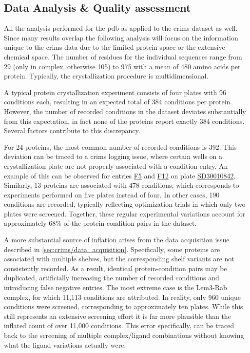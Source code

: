 \subsection{Data Analysis \& Quality assessment}

All the analysis performed for the \gls{pdb} as applied to the \gls{crims} dataset as well. Since many results overlap the following analysis will focus on the information unique to the \gls{crims} data due to the limited protein space or the extensive chemical space. 
The number of residues for the individual sequences range from 29 (only in complex, otherwise 105) to 975 with a mean of 480 amino acids per protein. Typically, the crystallization procedure is multidimensional. 

A typical protein crystallization experiment consists of four plates with 96 conditions each, resulting in an expected total of 384 conditions per protein. However, the number of recorded conditions in the dataset deviates substantially from this expectation, in fact none of the proteins report exactly 384 conditions. Several factors contribute to this discrepancy.

For 24 proteins, the most common number of recorded conditions is 392. This deviation can be traced to a \gls{crims} logging issue, where certain wells on a crystallization plate are not properly associated with a condition entry. An example of this can be observed for entries \href{https://htx-hh.embl.org/#/bridge/plates/SD30010842/inspections/5#F5-1}{F5} and \href{https://htx-hh.embl.org/#/bridge/plates/SD30010842/inspections/5#F12-1}{F12} on plate \href{https://htx-hh.embl.org/#/bridge/plates/SD30010842/inspections/5}{SD30010842}. Similarly, 13 proteins are associated with 478 conditions, which corresponds to experiments performed on five plates instead of four. In other cases, 190 conditions are recorded, typically reflecting optimization trials in which only two plates were screened. Together, these regular experimental variations account for approximately 68\% of the protein-condition pairs in the dataset.

A more substantial source of inflation arises from the data acquisition issue described in \autoref{sec:crims/data_acquisition}. Specifically, some proteins are associated with multiple shelves, but the corresponding shelf variants are not consistently recorded. As a result, identical protein-condition pairs may be duplicated, artificially increasing the number of recorded conditions and introducing false negative entries. The most extreme case is the Lem3-Rab complex, for which 11,113 conditions are attributed. In reality, only 960 unique conditions were screened, corresponding to approximately ten plates. While this still represents an extensive screening effort it is far more plausible than the inflated count of over 11,000 conditions. This error specifically, can be traced back to the screening of multiple complex/ligand combinations without knowing what the ligand variations actually were.

